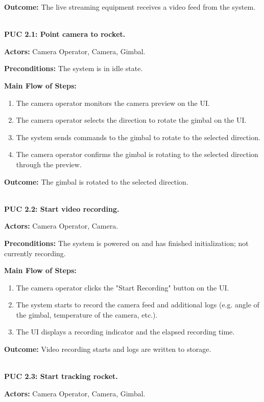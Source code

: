\documentclass[12pt]{article}
\begin{document}
\textbf{Outcome:} The live streaming equipment receives a video feed from the system.

~\\

\textbf{PUC 2.1: Point camera to rocket.}

\textbf{Actors:} Camera Operator, Camera, Gimbal.

\textbf{Preconditions:} The system is in idle state.

\textbf{Main Flow of Steps:}
\begin{enumerate}
  \item The camera operator monitors the camera preview on the UI.
  \item The camera operator selects the direction to rotate the gimbal on the UI.
  \item The system sends commands to the gimbal to rotate to the selected direction.
  \item The camera operator confirms the gimbal is rotating to the selected direction
        through the preview.
\end{enumerate}

\textbf{Outcome:} The gimbal is rotated to the selected direction.

~\\

\textbf{PUC 2.2: Start video recording.}

\textbf{Actors:} Camera Operator, Camera.

\textbf{Preconditions:} The system is powered on and has finished initialization; not currently recording.

\textbf{Main Flow of Steps:}
\begin{enumerate}
  \item The camera operator clicks the "Start Recording" button on the UI.
  \item The system starts to record the camera feed and additional logs (e.g. angle of
        the gimbal, temperature of the camera, etc.).
  \item The UI displays a recording indicator and the elapsed recording time.
\end{enumerate}

\textbf{Outcome:} Video recording starts and logs are written to storage.

~\\

\textbf{PUC 2.3: Start tracking rocket.}

\textbf{Actors:} Camera Operator, Camera, Gimbal.
\end{document}
